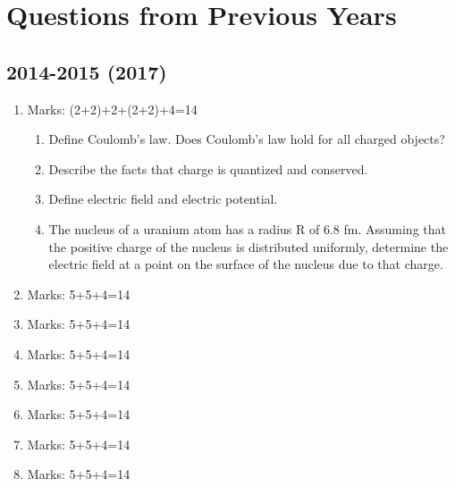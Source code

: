 \documentclass[../main.tex]{subfiles}
\begin{document}
\chapter*{Questions from Previous Years}
\section*{2014-2015 (2017)}
\begin{enumerate}
    \item Marks: (2+2)+2+(2+2)+4=14
    \begin{enumerate}
        \item Define Coulomb's law. Does Coulomb's law hold for all charged objects?
        \item Describe the facts that charge is quantized and conserved.
        \item Define electric field and electric potential.
        \item The nucleus of a uranium atom has a radius R of 6.8 fm. Assuming that the positive charge of the nucleus is distributed uniformly, determine the electric field at a point on the surface of the nucleus due to that charge.
    \end{enumerate}
    \item Marks: 5+5+4=14
    \item Marks: 5+5+4=14
    \item Marks: 5+5+4=14
    \item Marks: 5+5+4=14
    \item Marks: 5+5+4=14
    \item Marks: 5+5+4=14
    \item Marks: 5+5+4=14
\end{enumerate}
\end{document}
